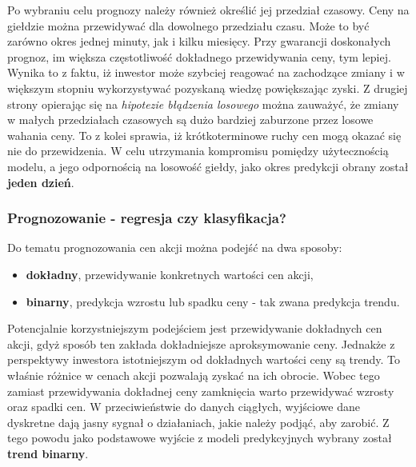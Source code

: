 \documentclass[a4paper, twoside, 11pt, openright]{article}
\begin{document}
\bigskip

Po wybraniu celu prognozy należy również określić jej przedział czasowy. Ceny na giełdzie można przewidywać dla dowolnego przedziału czasu. Może to być zarówno okres jednej minuty, jak i kilku miesięcy. Przy gwarancji doskonałych prognoz, im większa częstotliwość dokładnego przewidywania ceny, tym lepiej. Wynika to z faktu, iż inwestor może szybciej reagować na zachodzące zmiany i w większym stopniu wykorzystywać pozyskaną wiedzę powiększając zyski. Z drugiej strony opierając się na \textit{hipotezie błądzenia losowego} można zauważyć, że zmiany w małych przedziałach czasowych są dużo bardziej zaburzone przez losowe wahania ceny. To z kolei sprawia, iż krótkoterminowe ruchy cen mogą okazać się nie do przewidzenia. W celu utrzymania kompromisu pomiędzy użytecznością modelu, a jego odpornością na losowość giełdy, jako okres predykcji obrany został \textbf{jeden dzień}.
 
\subsubsection{Prognozowanie - regresja czy klasyfikacja?}

Do tematu prognozowania cen akcji można podejść na dwa sposoby:
\begin{itemize}
\item{\textbf{dokładny}, przewidywanie konkretnych wartości cen akcji,}
\item{\textbf{binarny}, predykcja wzrostu lub spadku ceny - tak zwana predykcja trendu.}
\end{itemize}

Potencjalnie korzystniejszym podejściem jest przewidywanie dokładnych cen akcji, gdyż sposób ten zakłada  dokładniejsze aproksymowanie ceny. Jednakże z perspektywy inwestora istotniejszym od dokładnych wartości ceny są trendy. To właśnie różnice w cenach akcji pozwalają zyskać na ich obrocie. Wobec tego zamiast przewidywania dokładnej ceny zamknięcia warto przewidywać wzrosty oraz spadki cen. W przeciwieństwie do danych ciągłych, wyjściowe dane dyskretne  dają jasny sygnał o działaniach, jakie należy podjąć, aby zarobić. Z tego powodu jako podstawowe wyjście z modeli predykcyjnych wybrany został \textbf{trend binarny}.

\bigskip
\end{document}
